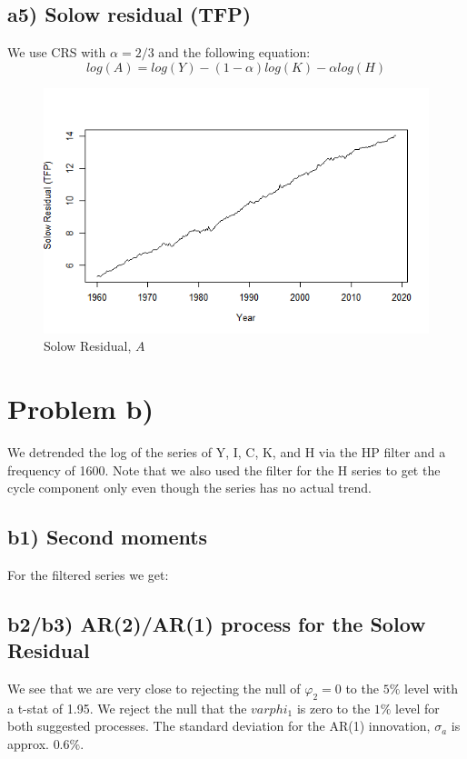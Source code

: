 \documentclass[10pt,letter]{article}
\begin{document}
\subsection*{a5) Solow residual (TFP)}
We use CRS with $\alpha = 2/3$ and the following equation: $$log(A)= log(Y)-(1-\alpha)log(K)-\alpha log(H)$$

	\begin{figure}[H]
	\centering
	\includegraphics[width=1\linewidth]{A5_SolowRes.png}
	\caption{Solow Residual, $A$}
	\label{fig:SolowRes}
\end{figure} 

\section*{Problem b)}
We detrended the log of the series of Y, I, C, K, and H via the HP filter and a frequency of 1600. Note that we also used the filter for the H series to get the cycle component only even though the series has no actual trend.
\subsection*{b1) Second moments}
For the filtered series we get:


\subsection*{b2/b3) AR(2)/AR(1) process for the Solow Residual}

We see that we are very close to rejecting the null of $\varphi_2 = 0$ to the $5\%$ level with a t-stat of 1.95. We reject the null that the $varphi_1$ is zero to the $1\%$ level for both suggested processes.
The standard deviation for the AR(1) innovation, $\sigma_a$ is approx. $0.6\%$.
\end{document}
